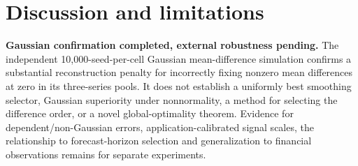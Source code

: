 \documentclass[11pt]{article}
\begin{document}
\section{Discussion and limitations}
\textbf{Gaussian confirmation completed, external robustness pending.}
The independent 10,000-seed-per-cell Gaussian mean-difference
simulation confirms a substantial reconstruction penalty for
incorrectly fixing nonzero mean differences at zero in its
three-series pools. It does not establish a uniformly best
smoothing selector, Gaussian superiority under nonnormality,
a method for selecting the difference order, or a novel
global-optimality theorem. Evidence for dependent/non-Gaussian
errors, application-calibrated signal scales, the relationship
to forecast-horizon selection and generalization to financial
observations remains for separate experiments.



\end{document}
